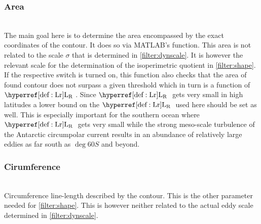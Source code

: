 \subsubsection{Area} \label{filter:area}
\\
The main goal here is to determine the area encompassed by the exact coordinates of the contour. It does so via MATLAB's  function. This area is not related to the scale $\sigma$ that is determined in \ref{filter:dynscale}. It is however the relevant scale for the determination of the isoperimetric quotient in \ref{filter:shape}.\\
If the respective switch is turned on, this function also checks that the area of found contour does not surpass a given threshold which in turn is a function of $\Lr$. Since $\Lr$ gets very small in high latitudes a lower bound on the $\Lr$ used here should be set as well. This is especially important for the southern ocean where $\Lr$ gets very small while the strong meso-scale turbulence of the Antarctic circumpolar current results in an abundance of relatively large eddies as far south as $\deg{60} S$ and beyond.
\subsubsection{Cirumference}
\\
Circumference \eg line-length described by the contour. This is the other parameter needed for \ref{filter:shape}. This is however neither related to the actual eddy scale determined in
\ref{filter:dynscale}.

